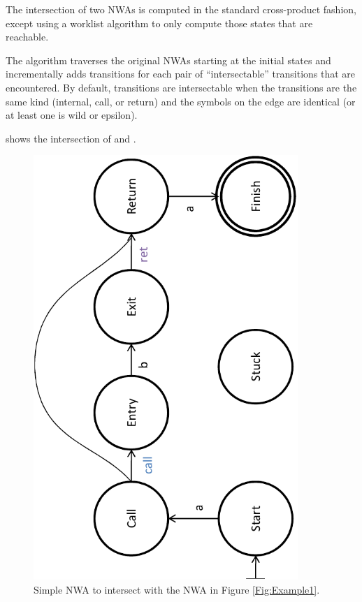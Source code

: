 The intersection of two NWAs is computed in the standard cross-product
fashion, except using a worklist algorithm to only compute those states that
are reachable.

The algorithm traverses the original NWAs starting at
the initial states and incrementally adds transitions for each pair of
``intersectable'' transitions that are encountered. By default, transitions
are intersectable when the transitions are the same kind (internal, call,
or return) and the symbols on the edge are identical (or at least one is wild
or epsilon).

 shows the intersection of  and
.
 
\begin{figure}[htbp]
  \centering
    \includegraphics[width=10cm]{Figures/Figure5}
  \caption{Simple NWA to intersect with the NWA in Figure \ref{Fig:Example1}.}
  \label{Fig:Intersect1}
\end{figure}

